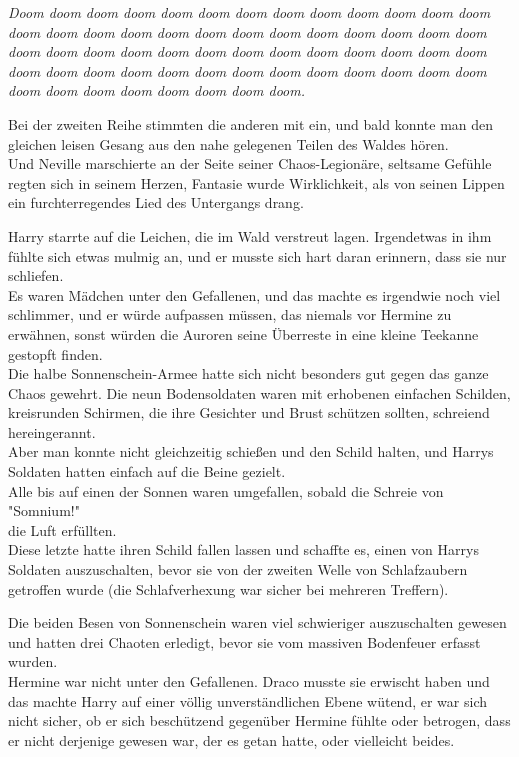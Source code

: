 {\emph{Doom doom doom doom doom doom doom doom doom doom doom doom doom doom doom doom doom doom doom doom doom doom doom doom doom doom doom doom doom doom doom doom doom doom doom doom doom doom doom doom doom doom doom doom doom doom doom doom doom doom doom doom doom doom doom doom doom doom doom doom.}

Bei der zweiten Reihe stimmten die anderen mit ein, und bald konnte man den gleichen leisen Gesang aus den nahe gelegenen Teilen des Waldes hören.\\ Und Neville marschierte an der Seite seiner Chaos-Legionäre, seltsame Gefühle regten sich in seinem Herzen, Fantasie wurde Wirklichkeit, als von seinen Lippen ein furchterregendes Lied des Untergangs drang.

Harry starrte auf die Leichen, die im Wald verstreut lagen. Irgendetwas in ihm fühlte sich etwas mulmig an, und er musste sich hart daran erinnern, dass sie nur schliefen.\\ Es waren Mädchen unter den Gefallenen, und das machte es irgendwie noch viel schlimmer, und er würde aufpassen müssen, das niemals vor Hermine zu erwähnen, sonst würden die Auroren seine Überreste in eine kleine Teekanne gestopft finden.\\ Die halbe Sonnenschein-Armee hatte sich nicht besonders gut gegen das ganze Chaos gewehrt. Die neun Bodensoldaten waren mit erhobenen einfachen Schilden, kreisrunden Schirmen, die ihre Gesichter und Brust schützen sollten, schreiend hereingerannt.\\ Aber man konnte nicht gleichzeitig schießen und den Schild halten, und Harrys Soldaten hatten einfach auf die Beine gezielt.\\ Alle bis auf einen der Sonnen waren umgefallen, sobald die Schreie von "Somnium!"\\ die Luft erfüllten.\\ Diese letzte hatte ihren Schild fallen lassen und schaffte es, einen von Harrys Soldaten auszuschalten, bevor sie von der zweiten Welle von Schlafzaubern getroffen wurde (die Schlafverhexung war sicher bei mehreren Treffern).

Die beiden Besen von Sonnenschein waren viel schwieriger auszuschalten gewesen und hatten drei Chaoten erledigt, bevor sie vom massiven Bodenfeuer erfasst wurden.\\ Hermine war nicht unter den Gefallenen. Draco musste sie erwischt haben und das machte Harry auf einer völlig unverständlichen Ebene wütend, er war sich nicht sicher, ob er sich beschützend gegenüber Hermine fühlte oder betrogen, dass er nicht derjenige gewesen war, der es getan hatte, oder vielleicht beides.

}
